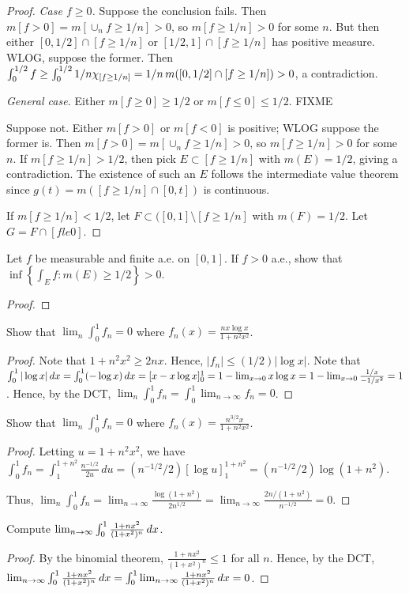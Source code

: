 \documentclass{article}
\begin{document}
\begin{proof}
\emph{Case $f \ge 0$.} Suppose the conclusion fails. Then $m[f>0] = m[\cup_n f \ge 1/n] > 0$, so $m[f \ge 1/n] > 0$ for some $n$. But then either $[0,1/2] \cap [f \ge 1/n]$ or $[1/2, 1] \cap [f \ge 1/n]$ has positive measure. WLOG, suppose the former.  Then $\int_0^{1/2} f \ge \int_0^{1/2} 1/n \chi_{[f \ge 1/n]} = 1/n \,m([0,1/2] \cap [f \ge 1/n]) > 0$, a contradiction.

\emph{General case.} Either $m[f \ge 0] \ge 1/2$ or $m[f \le 0] \le 1/2$. FIXME

Suppose not. Either $m[f >0]$ or $m[f < 0]$ is positive; WLOG suppose the former is. Then $m[f>0] = m[\cup_n f \ge 1/n] > 0$, so $m[f \ge 1/n] > 0$ for some $n$.
If $m[f \ge 1/n] > 1/2$, then pick $E \subset [f \ge 1/n]$ with $m(E) = 1/2$, giving a contradiction.  The existence of such an $E$ follows the intermediate value theorem since $g(t) = m( [f \ge 1/n] \cap [0,t])$ is continuous.

If $m[f \ge 1/n] < 1/2$, let $F \subset ([0,1] \setminus [f \ge 1/n]$ with $m(F) = 1/2$. Let $G = F \cap [f le 0]$.
\end{proof}
 Let $f$ be measurable and finite a.e. on $[0,1]$. If $f > 0$ a.e., show that $\inf \left\{ \int_E f : m(E) \ge 1/2 \right\} > 0$.
\begin{proof}
\end{proof}
 Show that $\lim_n \int_0^1 f_n = 0$ where $f_n(x) = \frac{nx \log x} {1 + n^2x^2}$.
\begin{proof}
Note that $1 + n^2x^2 \ge 2nx$. Hence, $|f_n| \le (1/2) |\log x|$. Note that $\int_0^1 |\log x| \,dx = \int_0^1 (-\log x) \,dx = [x - x \log x]_0^1 
= 1 - \lim_{x\to 0} x \log x = 1 - \lim_{x\to 0}  \frac {1/x} {-1/x^2} = 1$. Hence, by the DCT,
$\lim_n \int_0^1 f_n  = \int_0^1 \lim_{n\to\infty} f_n = 0$.
\end{proof}
 Show that $\lim_n \int_0^1 f_n = 0$ where $f_n(x) = \frac{n^{3/2} x} {1 + n^2x^2}$.
\begin{proof}
Letting $u = 1 + n^2 x^2$, we have $\int_0^1 f_n = \int_1^{1+n^2} \frac{n^{-1/2}}{2u} \,du = (n^{-1/2}/2) [\log u]_1^{1+n^2} = (n^{-1/2}/2) \log (1+n^2)$.

Thus, $\lim_n \int_0^1 f_n = \lim_{n\to\infty} \frac {\log (1+n^2)}{2 n^{1/2}} = \lim_{n\to\infty}  \frac{2n/(1+n^2)} {n^{-1/2}} = 0$.
\end{proof}
 Compute $\lim_{n\to\infty} \int_0^1 \frac{ 1+ nx^2} {(1+x^2)^n} \,dx$.
\begin{proof} By the binomial theorem, $\frac{ 1+ nx^2} {(1+x^2)^n} \le 1$ for all $n$. 
Hence, by the DCT, $\lim_{n\to\infty} \int_0^1 \frac{ 1+ nx^2} {(1+x^2)^n} \,dx = \int_0^1 \lim_{n\to\infty} \frac{ 1+ nx^2} {(1+x^2)^n} \,dx = 0$.
\end{proof}
\end{document}

